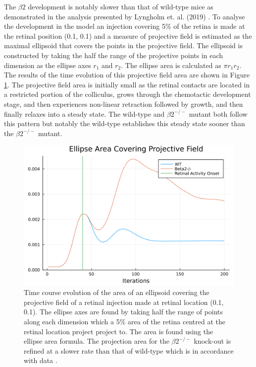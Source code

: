 The $\beta2$ development is notably slower than that of wild-type mice as demonstrated in the analysis presented by Lyngholm et. al. (2019) \cite{Lyngholm2019-fs}. To analyse the development in the model an injection covering 5\% of the retina is made at the retinal position (0.1, 0.1) and a measure of projective field is estimated as the maximal ellipsoid that covers the points in the projective field. The ellipsoid is constructed by taking the half the range of the projective points in each dimension as the ellipse axes $r_1$ and $r_2$. The ellipse area is calculated as $\pi r_1 r_2$. The results of the time evolution of this projective field area are shown in Figure \ref{fig:beta2WTprojectionevolution}. The projective field area is initially small as the retinal contacts are located in a restricted portion of the colliculus, grows through the chemotactic development stage, and then experiences non-linear retraction followed by growth, and then finally relaxes into a steady state. The wild-type and $\beta2^{-/-}$ mutant both follow this pattern but notably the wild-type establishes this steady state sooner than the $\beta2^{-/-}$ mutant. 

\begin{figure}[hbt!]
	\centering
	\includegraphics[width=\textwidth]{images/distributed_kernels/figure_beta2vsWTprojection}
	\def\c{Time course evolution of the area of an ellipsoid covering the projective field of a retinal injection made at retinal location (0.1, 0.1). }
	\caption[\c]{\label{fig:beta2WTprojectionevolution} \c The ellipse axes are found by taking half the range of points along each dimension which a 5\% area of the retina centred at the retinal location project project to. The area is found using the ellipse area formula. The projection area for the $\beta2^{-/-}$ knock-out is refined at a slower rate than that of wild-type which is in accordance with data \cite{Lyngholm2019-fs}.}
\end{figure}
\newpage
